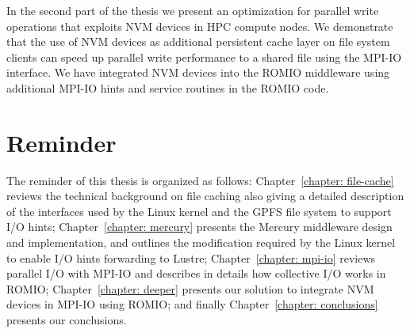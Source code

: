 In the second part of the thesis we present an optimization for parallel write operations that exploits NVM devices in HPC compute nodes. We demonstrate that the use of NVM devices as additional persistent cache 
layer on file system clients can speed up parallel write performance to a shared file using the MPI-IO interface. We have integrated NVM devices into the ROMIO middleware using additional MPI-IO hints and service
routines in the ROMIO code. 

\section{Reminder}
The reminder of this thesis is organized as follows: Chapter~\ref{chapter: file-cache} reviews the technical background on file caching also giving a detailed description of the interfaces used by the Linux kernel
and the GPFS file system to support I/O hints; Chapter~\ref{chapter: mercury} presents the Mercury middleware design and implementation, and outlines the modification required by the Linux kernel to enable I/O 
hints forwarding to Lustre; Chapter~\ref{chapter: mpi-io} reviews parallel I/O with MPI-IO and describes in details how collective I/O works in ROMIO; Chapter~\ref{chapter: deeper} presents our solution to 
integrate NVM devices in MPI-IO using ROMIO; and finally Chapter~\ref{chapter: conclusions} presents our conclusions.

